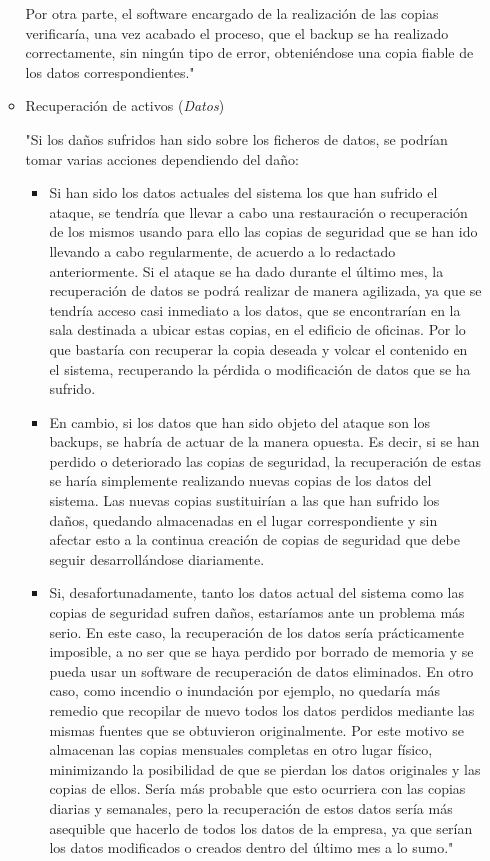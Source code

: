 \documentclass[a4paper,11pt,bibtotoc,noliststotoc]{scrbook}
\begin{document}
\begin{itemize}
\begin{itemize}
Por otra parte, el software encargado de la realización de las copias verificaría, una vez acabado el proceso, que el backup se ha realizado correctamente, sin ningún tipo de error, obteniéndose una copia fiable de los datos correspondientes."

\item Recuperación de activos (\emph{Datos})

"Si los daños sufridos han sido sobre los ficheros de datos, se podrían tomar varias acciones dependiendo del daño:

	\begin{itemize}
	\item Si han sido los datos actuales del sistema los que han sufrido el ataque, se tendría que llevar a cabo una restauración o recuperación de los mismos usando para ello las copias de seguridad que se han ido llevando a cabo regularmente, de acuerdo a lo redactado anteriormente. Si el ataque se ha dado durante el último mes, la recuperación de datos se podrá realizar de manera agilizada, ya que se tendría acceso casi inmediato a los datos, que se encontrarían en la sala destinada a ubicar estas copias, en el edificio de oficinas. Por lo que bastaría con recuperar la copia deseada y volcar el contenido en el sistema, recuperando la pérdida o modificación de datos que se ha sufrido.
	\item En cambio, si los datos que han sido objeto del ataque son los backups, se habría de actuar de la manera opuesta. Es decir, si se han perdido o deteriorado las copias de seguridad, la recuperación de estas se haría simplemente realizando nuevas copias de los datos del sistema. Las nuevas copias sustituirían a las que han sufrido los daños, quedando almacenadas en el lugar correspondiente y sin afectar esto a la continua creación de copias de seguridad que debe seguir desarrollándose diariamente.
	\item Si, desafortunadamente, tanto los datos actual del sistema como las copias de seguridad sufren daños, estaríamos ante un problema más serio. En este caso, la recuperación de los datos sería prácticamente imposible, a no ser que se haya perdido por borrado de memoria y se pueda usar un software de recuperación de datos eliminados. En otro caso, como incendio o inundación por ejemplo, no quedaría más remedio que recopilar de nuevo todos los datos perdidos mediante las mismas fuentes que se obtuvieron originalmente. Por este motivo se almacenan las copias mensuales completas en otro lugar físico, minimizando la posibilidad de que se pierdan los datos originales y las copias de ellos. Sería más probable que esto ocurriera con las copias diarias y semanales, pero la recuperación de estos datos sería más asequible que hacerlo de todos los datos de la empresa, ya que serían los datos modificados o creados dentro del último mes a lo sumo."
	\end{itemize}


\end{itemize}
\end{itemize}
\end{document}
